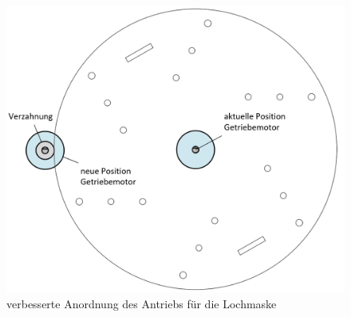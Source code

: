 \begin{figure}[H]
	\includegraphics[draft=false,scale=0.3]{Illustrationen/8-Fazit/optimierung_lochmaske.png}
	\caption{verbesserte Anordnung des Antriebs für die Lochmaske}
	\label{fig:optimierung_lochmaske}
\end{figure}
